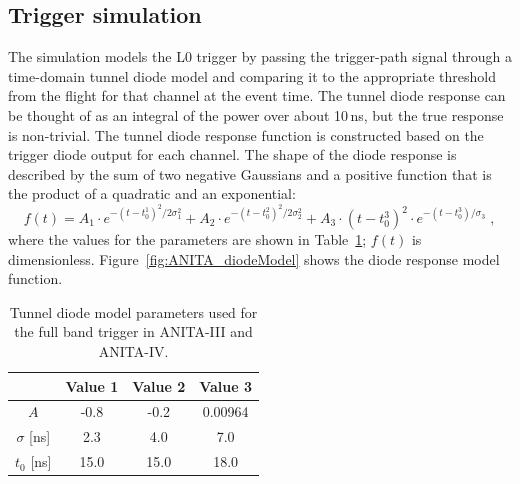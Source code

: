 


\subsection{Trigger simulation}
\label{subsec:ANITA_trigger}
The simulation models the L0 trigger by passing the
trigger-path signal through a time-domain tunnel diode model and comparing it to the
appropriate threshold from the flight for that channel at the event
time.
The tunnel diode response can be thought of as an integral of the power over about 10\,ns, but the true response is non-trivial.
The tunnel diode response function is constructed based on the trigger diode output for each channel.
The shape of the diode response is described by the sum of two negative Gaussians and a positive function that is the product of a quadratic and an exponential:
\begin{equation}
      f(t) = A_1 \cdot e^{-(t-t_0^1)^2/2\sigma_1^2} + 
      A_2 \cdot e^{-(t-t_0^2)^2/2\sigma_2^2} +
      A_3 \cdot \left( t-t_0^3 \right)^2 \cdot
      e^{-(t-t_0^3)/\sigma_3} \;,
    \end{equation}
\noindent where the values for the parameters are shown in
Table~\ref{tab:diodeModelParameters};
$f(t)$ is dimensionless.
Figure~\ref{fig:ANITA_diodeModel} shows the diode response model function.

\begin{table}[h!]
\caption{Tunnel diode model parameters used for the full band trigger in ANITA-III and ANITA-IV.}
  \begin{center}
    \begin{tabular}{c|c|c|c} 
      & Value 1 & Value 2 & Value 3 \\
     \hline
      $A$           & -0.8  & -0.2   &  0.00964   \\
      $\sigma$ [ns] &  2.3  &  4.0   &  7.0       \\ 
      $t_0$  [ns]   & 15.0  & 15.0   & 18.0       \\
    \end{tabular}
  \end{center}
  \label{tab:diodeModelParameters}
\end{table}


